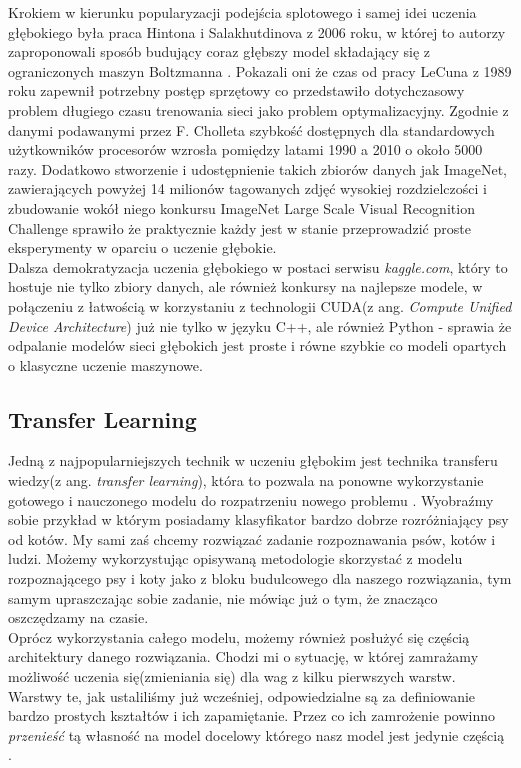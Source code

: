Krokiem w kierunku popularyzacji podejścia splotowego i samej idei uczenia głębokiego była praca Hintona i Salakhutdinova z 2006 roku, w której to autorzy zaproponowali sposób budujący coraz głębszy model składający
się z ograniczonych maszyn Boltzmanna \cite{hinton}. Pokazali oni że czas od pracy LeCuna z 1989 roku \cite{lecun} zapewnił potrzebny postęp sprzętowy co przedstawiło dotychczasowy problem długiego czasu trenowania sieci jako problem optymalizacyjny. Zgodnie z danymi podawanymi przez F. Cholleta \cite{deep} szybkość dostępnych dla standardowych użytkowników procesorów wzrosła pomiędzy latami 1990 a 2010 o około 5000 razy. Dodatkowo stworzenie i udostępnienie takich zbiorów danych jak ImageNet, zawierających powyżej 14 milionów tagowanych zdjęć wysokiej rozdzielczości i zbudowanie wokół niego konkursu ImageNet Large Scale Visual Recognition Challenge \cite{imagenet} sprawiło że praktycznie każdy jest w stanie przeprowadzić proste eksperymenty w oparciu o uczenie głębokie. \\

Dalsza demokratyzacja uczenia głębokiego w postaci serwisu \textit{kaggle.com}, który to hostuje nie tylko zbiory danych, ale również konkursy na najlepsze modele, w połączeniu z łatwością w korzystaniu z technologii CUDA(z ang. \textit{Compute Unified Device Architecture}) już nie tylko w języku C++, ale również Python - sprawia że odpalanie modelów sieci głębokich jest proste i równe szybkie co modeli opartych o klasyczne uczenie maszynowe\cite{deep}.

\subsection{Transfer Learning}

Jedną z najpopularniejszych technik w uczeniu głębokim jest technika transferu wiedzy(z ang. \textit{transfer learning}), która to pozwala na ponowne wykorzystanie gotowego i nauczonego modelu do rozpatrzeniu nowego problemu \cite{hands_on}. Wyobraźmy sobie przykład w którym posiadamy klasyfikator bardzo dobrze rozróżniający psy od kotów. My sami zaś chcemy rozwiązać zadanie rozpoznawania psów, kotów i ludzi. Możemy wykorzystując opisywaną metodologie skorzystać z modelu rozpoznającego psy i koty jako z bloku budulcowego dla naszego rozwiązania, tym samym upraszczając sobie zadanie, nie mówiąc już o tym, że znacząco oszczędzamy na czasie. \\

Oprócz wykorzystania całego modelu, możemy również posłużyć się częścią architektury danego rozwiązania. Chodzi mi o sytuację, w której zamrażamy możliwość uczenia się(zmieniania się) dla wag z kilku pierwszych warstw. Warstwy te, jak ustaliliśmy już wcześniej, odpowiedzialne są za definiowanie bardzo prostych kształtów i ich zapamiętanie. Przez co ich zamrożenie powinno \textit{przenieść} tą własność na model docelowy którego nasz model jest jedynie częścią \cite{python_ml}.
